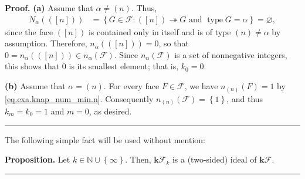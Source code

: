 \documentclass[12pt]{article}
\theoremstyle{definition}%
\newtheorem{prop}[thm]{Proposition}
\theoremstyle{definition}%
\theoremstyle{remark}%
\newcommand{\tup}[1]{\left( #1 \right)}
\newcommand{\interval}[1]{\left[ #1 \right]} %
\newcommand{\set}[1]{\left\{ #1 \right\}}
\newcommand{\card}[1]{\left| #1 \right|} %
\newcommand{\NN}{\mathbb{N}}
\newcommand{\kk}{\mathbf{k}}
\newcommand{\kf}{\kk\mathcal{F}}
\newcommand{\CF}{\mathcal{F}}
\newcommand{\na}{n_{ \alpha } }%
\newcommand{\Na}{N_{ \alpha } }%
\newcommand{\type}{\operatorname{type}}
\newcommand{\con}{\twoheadrightarrow} %
\newenvironment{prop}[1][Proposition]{\noindent\textbf{#1.} }{\ \rule{0.5em}{0.5em}}
\newenvironment{proof}[1][Proof]{\noindent\textbf{#1.} }{\ \rule{0.5em}{0.5em}}
\begin{document}
\begin{proof}
    \textbf{(a)} Assume that $\alpha \neq \tup{n}$.
	Thus,
    \begin{align*}
        \Na\tup{ \tup{ \interval{n} } }
		&= {\set{G \in \CF : \tup{ \interval{n} } \con G \text{ and } \type G = \alpha }}
		= \varnothing ,
    \end{align*}
    since the face $ \tup{ \interval{n} } $ is contained only in itself and is of type $ \tup{ n } \ne \alpha $ by assumption.
	Therefore, $\na\tup{ \tup{ \interval{n} } } = 0$,
	so that $0 = \na\tup{ \tup{ \interval{n} } } \in \na\tup{ \CF } $.
	Since $\na\tup{ \CF }$ is a set of nonnegative integers, this shows that $0$ is its smallest element; that is, $ k_{0}=0 $.


%
    \textbf{(b)} Assume that $\alpha = \tup{n}$.
	For every face $ F \in \CF $, we have
	$n_{\tup{ n }}\tup{F} = 1$ by
	\eqref{eq.exa.knap_num_min.n}.
	Consequently $ n_{\tup{ n }}\tup{ \CF } = \set{1} $,
	and thus $ k_{m}=k_{0}=1 $ and $m = 0$, as desired.
\end{proof}

The following simple fact will be used without mention:

\begin{prop}
\label{prop.kfk-ideal}
Let $k \in \NN \cup \set{\infty}$.
Then, $\kf_k$ is a (two-sided) ideal of $ \kf $.
\end{prop}
\end{document}
